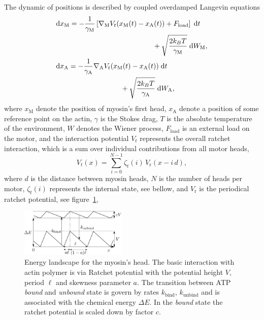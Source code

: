 \documentclass[aps,pre,twocolumn,showpacs,showkeys,superscriptaddress,floatfix]{revtex4-1}
\newcommand{\rmd}{{\mathrm d}}
\begin{document}
The dynamic of positions is described by coupled overdamped Langevin equations 
\begin{align}
&\begin{multlined}[b]
\rmd x_\text{M} = 
- \frac{1}{\gamma_\text{M}} \left[ \nabla_\text{M} V_t(x_\text{M}(t) - x_\text{A}(t)) + F_\text{load} \right] \; \rmd t 
\\ 
+ \sqrt{ \frac{2 k_B T}{\gamma_\text{M}} } \; \rmd W_\text{M} ,
\end{multlined}
\label{eq:eom_M} \\
&\begin{multlined}[b][.42\textwidth]
\rmd x_\text{A} = 
- \frac{1}{\gamma_\text{A}} \nabla_\text{A} V_t(x_\text{M}(t) - x_\text{A}(t)) \; \rmd t 
\\
+ \sqrt{ \frac{2 k_B T}{\gamma_\text{A}} } \; \rmd W_\text{A} ,
\end{multlined}
\label{eq:eom_A}
\end{align}
where $x_\text{M}$ denote the position of myosin's first head, 
$x_\text{A}$ denote a position of some reference point on the actin, 
$\gamma$ is the Stokes drag,
$T$ is the absolute temperature of the environment,
$W$ denotes the Wiener process,
$F_\text{load}$ is an external load on the motor, 
and the interaction potential $V_t$ represents the overall ratchet interaction, 
which is a sum over individual contributions from all motor heads,
\begin{equation}
V_t(x) = \sum\limits_{i=0}^{N-1} \zeta_t(i) \, V_\text{r} (x - i \, d ), 
\label{eq:ratchet_interaction}
\end{equation}
where $d$ is the distance between myosin heads, 
$N$ is the number of heads per motor,
$\zeta_t(i)$ represents the internal state, see bellow, 
and $V_\text{r}$ is the periodical ratchet potential, see figure~\ref{fig:energy},
\begin{figure}[t]
\centering
\includegraphics[width=0.45\textwidth,height=!]{energy}
\caption{
\label{fig:energy}
Energy landscape for the myosin's head.
The basic interaction with actin polymer is via Ratchet potential with the potential height $V$, period $\ell$ and skewness parameter $a$.
The transition between ATP \emph{bound} and \emph{unbound} state is govern by rates $k_\text{bind}$, $k_\text{unbind}$ 
and is associated with the chemical energy $\Delta E$.
In the \emph{bound} state the ratchet potential is scaled down by factor $c$. 
}
\end{figure}
\end{document}
